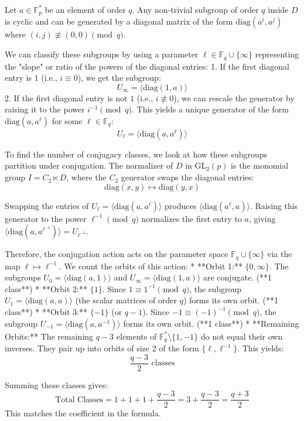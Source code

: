   Let $a \in \mathbb{F}_p^*$ be an element of order $q$. Any non-trivial subgroup of order $q$ inside $D$ is cyclic and can be generated by a diagonal matrix of the form $\text{diag}(a^i, a^j)$ where $(i, j) \not\equiv (0, 0) \pmod q$. 

  We can classify these subgroups by using a parameter $\ell \in \mathbb{F}_q \cup \{\infty\}$ representing the "slope" or ratio of the powers of the diagonal entries:
  1. If the first diagonal entry is $1$ (i.e., $i \equiv 0$), we get the subgroup:
     $$U_{\infty} = \langle \text{diag}(1, a) \rangle$$
  2. If the first diagonal entry is not $1$ (i.e., $i \not\equiv 0$), we can rescale the generator by raising it to the power $i^{-1} \pmod q$. This yields a unique generator of the form $\text{diag}(a, a^{\ell})$ for some $\ell \in \mathbb{F}_q$:
     $$U_{\ell} = \langle \text{diag}(a, a^{\ell}) \rangle$$

  To find the number of conjugacy classes, we look at how these subgroups partition under conjugation. The normalizer of $D$ in $\text{GL}_2(p)$ is the monomial group $I = C_2 \ltimes D$, where the $C_2$ generator swaps the diagonal entries:
  $$\text{diag}(x, y) \mapsto \text{diag}(y, x)$$

  Swapping the entries of $U_{\ell} = \langle \text{diag}(a, a^{\ell}) \rangle$ produces $\langle \text{diag}(a^{\ell}, a) \rangle$. Raising this generator to the power $\ell^{-1} \pmod q$ normalizes the first entry to $a$, giving $\langle \text{diag}(a, a^{\ell^{-1}}) \rangle = U_{\ell^{-1}}$.
  
  Therefore, the conjugation action acts on the parameter space $\mathbb{F}_q \cup \{\infty\}$ via the map $\ell \mapsto \ell^{-1}$. We count the orbits of this action:
  * **Orbit 1:** $\{0, \infty\}$. The subgroups $U_0 = \langle \text{diag}(a, 1) \rangle$ and $U_{\infty} = \langle \text{diag}(1, a) \rangle$ are conjugate. (**1 class**)
  * **Orbit 2:** $\{1\}$. Since $1 \equiv 1^{-1} \pmod q$, the subgroup $U_1 = \langle \text{diag}(a, a) \rangle$ (the scalar matrices of order $q$) forms its own orbit. (**1 class**)
  * **Orbit 3:** $\{-1\}$ (or $q-1$). Since $-1 \equiv (-1)^{-1} \pmod q$, the subgroup $U_{-1} = \langle \text{diag}(a, a^{-1}) \rangle$ forms its own orbit. (**1 class**)
  * **Remaining Orbits:** The remaining $q-3$ elements of $\mathbb{F}_q^* \setminus \{1, -1\}$ do not equal their own inverses. They pair up into orbits of size 2 of the form $\{\ell, \ell^{-1}\}$. This yields:
    $$\frac{q-3}{2} \text{ classes}$$

  Summing these classes gives:
  $$\text{Total Classes} = 1 + 1 + 1 + \frac{q-3}{2} = 3 + \frac{q-3}{2} = \frac{q+3}{2}$$
  This matches the coefficient in the formula.
